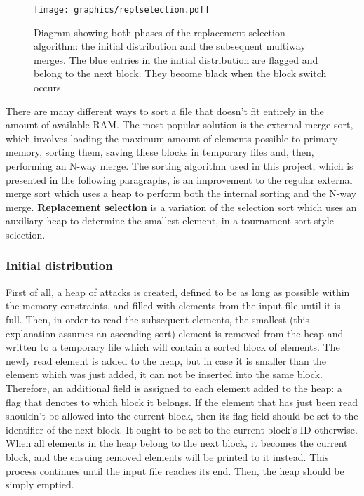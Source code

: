 \documentclass[10pt,a4paper]{article}
\numberwithin{equation}{section}
\begin{document}
\begin{figure}[H]
    \centering
    \texttt{[image: graphics/replselection.pdf]}
    \caption{Diagram showing both phases of the replacement selection algorithm: the initial distribution and the subsequent multiway merges. The blue entries in the initial distribution are flagged and belong to the next block. They become black when the block switch occurs.}
    \label{fig:replselection}
\end{figure}

There are many different ways to sort a file that doesn't fit entirely in the amount of available RAM. The most popular solution is the external merge sort, which involves loading the maximum amount of elements possible to primary memory, sorting them, saving these blocks in temporary files and, then, performing an N-way merge. The sorting algorithm used in this project, which is presented in the following paragraphs, is an improvement to the regular external merge sort which uses a heap to perform both the internal sorting and the N-way merge. \textbf{Replacement selection} is a variation of the selection sort which uses an auxiliary heap to determine the smallest element, in a tournament sort-style selection.

\subsubsection{Initial distribution}

First of all, a heap of attacks is created, defined to be as long as possible within the memory constraints, and filled with elements from the input file until it is full. Then, in order to read the subsequent elements, the smallest (this explanation assumes an ascending sort) element is removed from the heap and written to a temporary file which will contain a sorted block of elements. The newly read element is added to the heap, but in case it is smaller than the element which was just added, it can not be inserted into the same block. Therefore, an additional field is assigned to each element added to the heap: a flag that denotes to which block it belongs. If the element that has just been read shouldn't be allowed into the current block, then its flag field should be set to the identifier of the next block. It ought to be set to the current block's ID otherwise. When all elements in the heap belong to the next block, it becomes the current block, and the ensuing removed elements will be printed to it instead. This process continues until the input file reaches its end. Then, the heap should be simply emptied.
\end{document}
